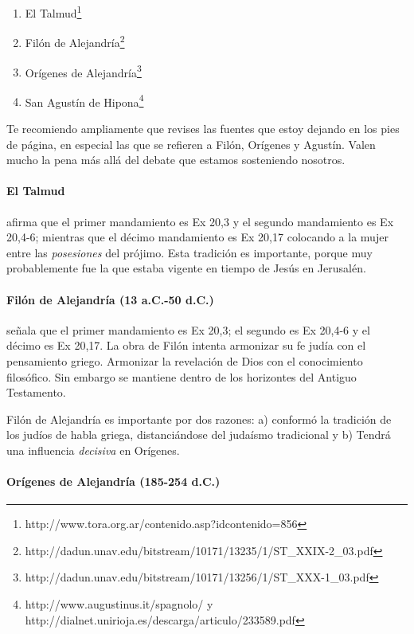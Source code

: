 \documentclass{article}
\begin{document}
\begin{enumerate}
\item El Talmud\footnote{http://www.tora.org.ar/contenido.asp?idcontenido=856}
\item Fil\'on de Alejandr\'{i}a\footnote{http://dadun.unav.edu/bitstream/10171/13235/1/ST\_XXIX-2\_03.pdf}
\item Or\'{i}genes de Alejandr\'{i}a\footnote{http://dadun.unav.edu/bitstream/10171/13256/1/ST\_XXX-1\_03.pdf}
\item San Agust\'{i}n de Hipona\footnote{http://www.augustinus.it/spagnolo/ y http://dialnet.unirioja.es/descarga/articulo/233589.pdf}
\end{enumerate}

\noindent
Te recomiendo ampliamente que revises las fuentes que estoy dejando en los pies de p\'agina, en especial las que se refieren a Fil\'on, Or\'{i}genes y Agust\'{i}n. Valen mucho la pena m\'as all\'a del debate que estamos sosteniendo nosotros.

\paragraph{El Talmud}

afirma que el primer mandamiento es Ex 20,3 y el segundo mandamiento es Ex 20,4-6; mientras que el d\'ecimo mandamiento es Ex 20,17 colocando a la mujer entre las \emph{posesiones} del pr\'ojimo. Esta tradici\'on es importante, porque muy probablemente fue la que estaba vigente en tiempo de Jes\'us en Jerusal\'en.

\paragraph{Fil\'on de Alejandr\'{i}a  (13 a.C.-50 d.C.)}

se\~nala que el primer mandamiento es Ex 20,3; el segundo es Ex 20,4-6 y el d\'ecimo es Ex 20,17. La obra de Fil\'on intenta armonizar su fe jud\'{i}a con el pensamiento griego. Armonizar la revelaci\'on de Dios con el conocimiento filos\'ofico. Sin embargo se mantiene dentro de los horizontes del Antiguo Testamento.

Fil\'on de Alejandr\'{i}a es importante por dos razones: a) conform\'o la tradici\'on de los jud\'{i}os de habla griega, distanci\'andose del juda\'{i}smo tradicional y b) Tendr\'a una influencia \emph{decisiva} en Or\'{i}genes.

\paragraph{Or\'{i}genes de Alejandr\'{i}a (185-254 d.C.)}
\end{document}
